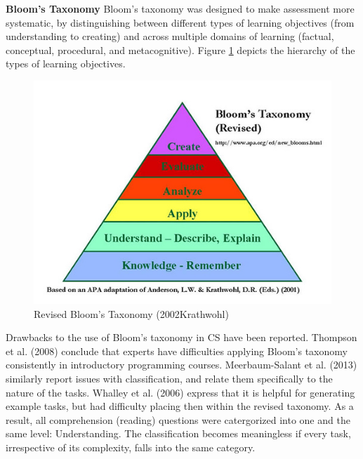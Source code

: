 \textbf{Bloom's Taxonomy}\newline
Bloom's taxonomy was designed to make assessment more systematic, by distinguishing between different types of learning objectives (from understanding to creating) and across multiple domains of learning (factual, conceptual, procedural, and metacognitive). Figure \ref{fig:BloomsRevised} depicts the hierarchy of the types of learning objectives.


\begin{figure}\label{fig:BloomsRevised}
\includegraphics[scale=0.6]{figures/bloomsrevised.jpg}
\caption{Revised Bloom's Taxonomy (2002Krathwohl)}
\end{figure}


Drawbacks to the use of Bloom's taxonomy in CS have been reported. Thompson et al. (2008) conclude that experts have difficulties applying Bloom's taxonomy consistently in introductory programming courses. Meerbaum-Salant et al. (2013) similarly report issues with classification, and relate them specifically to the nature of the tasks. Whalley et al. (2006) express that it is helpful for generating example tasks, but had difficulty placing then within the revised taxonomy. As a result, all comprehension (reading) questions were catergorized into one and the same level: Understanding. The classification becomes meaningless if every task, irrespective of its complexity, falls into the same category.


